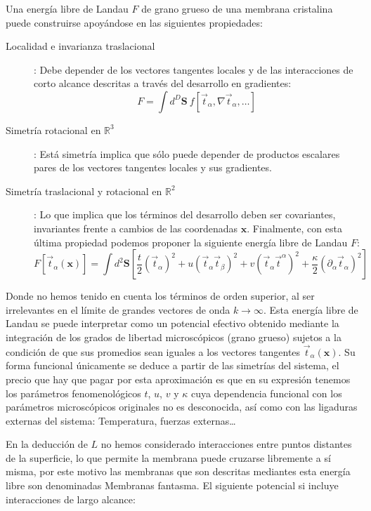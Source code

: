 Una energía libre de Landau $F$ de grano grueso de una membrana cristalina
puede construirse apoyándose en las siguientes propiedades:
\begin{description}
\item[Localidad e invarianza traslacional]: Debe depender de los vectores
  tangentes locales y de las interacciones de corto alcance descritas a través
  del desarrollo en gradientes:
  $$ F=\int\! d^D\mathbf{S}\ f[\vec{t}_{\alpha},\nabla
  \vec{t}_{\alpha},\dots]$$ 
\item[Simetría rotacional en $\mathbb{R}^3$]: Está simetría implica que sólo
  puede depender de productos escalares pares de los vectores tangentes
  locales y sus gradientes. 

\item[Simetría traslacional y rotacional en $\mathbb{R}^2$]: Lo que implica
  que los términos del desarrollo deben ser covariantes, invariantes frente a
  cambios de las coordenadas $\mathbf{x}$. Finalmente, con esta última
  propiedad podemos proponer la siguiente energía libre de Landau $F$:
  \begin{equation*}
    F[\vec{t}_{\alpha}(\mathbf{x})]=\int d^2\mathbf{S}
    \left[
      \frac{t}{2}(\vec{t}_{\alpha})^2+
      u(\vec{t}_{\alpha}\vec{t}_{\beta})^2+
      v(\vec{t}_{\alpha}\vec{t}^{\alpha})^2+
      \frac{\kappa}{2}(\partial_{\alpha}\vec{t}_{\alpha})^2
    \right]
  \end{equation*}
\end{description}


Donde no hemos tenido en cuenta los términos de orden superior, al ser
irrelevantes en el límite de grandes vectores de onda $k\rightarrow \infty$. 
Esta energía libre de Landau se puede interpretar como un potencial efectivo
obtenido mediante la integración de los grados de libertad microscópicos
(grano grueso) sujetos a la condición de que sus promedios sean iguales a los
vectores tangentes $\vec{t}_{\alpha}(\mathbf{x})$. Su forma funcional
únicamente se deduce a partir de las simetrías del sistema, el precio que hay
que pagar por esta aproximación es que en su expresión tenemos los parámetros
fenomenológicos $t$, $u$, $v$ y $\kappa$ cuya dependencia funcional con los
parámetros microscópicos originales no es desconocida, así como con las
ligaduras externas del sistema: Temperatura, fuerzas externas\dots  

En la deducción de $L$ no hemos considerado interacciones entre puntos
distantes de la superficie, lo que permite la membrana puede cruzarse
libremente a sí misma, por este motivo las membranas que son descritas
mediantes esta energía libre son denominadas Membranas fantasma. El siguiente
potencial si incluye interacciones de largo alcance:

